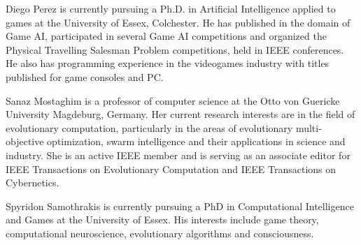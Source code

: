 \documentclass[journal]{IEEEtran}
\begin{document}
 
%


\begin{IEEEbiography}
{Diego Perez}
is currently pursuing a Ph.D. in Artificial Intelligence applied to games at the University of Essex, Colchester. He has published in the domain of Game AI, participated in several Game AI competitions and organized the Physical Travelling Salesman Problem competitions, held in IEEE conferences. He also has programming experience in the videogames industry with titles published for game consoles and PC.
\end{IEEEbiography}


\begin{IEEEbiography}
{Sanaz Mostaghim}
is a professor of computer science at the Otto von Guericke University Magdeburg, Germany. Her current research interests are in the field of evolutionary computation, particularly in the areas of evolutionary multi-objective optimization, swarm intelligence and their applications in science and industry. She is an active IEEE member and is serving as an associate editor for IEEE Transactions on Evolutionary Computation and IEEE Transactions on Cybernetics.
\end{IEEEbiography}

\begin{IEEEbiography}{Spyridon Samothrakis}
 is currently pursuing a PhD in Computational Intelligence and Games at the University of Essex. His interests include game theory, computational neuroscience, evolutionary algorithms and consciousness. 
\end{IEEEbiography}
\end{document}
